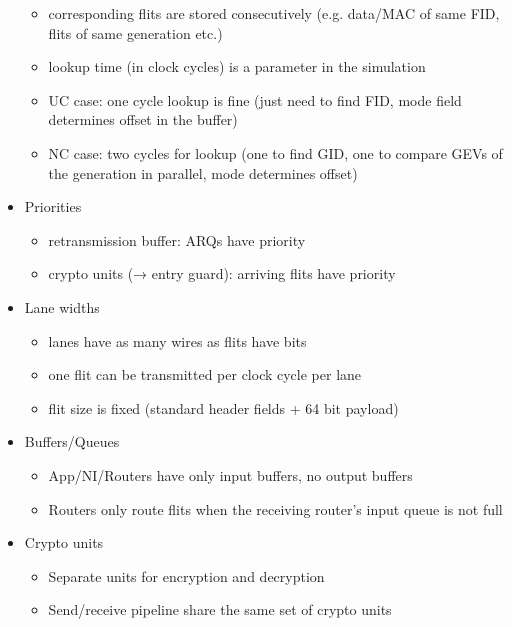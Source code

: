 \documentclass[
	paper=a4,
	fontsize=11pt,
	parskip=full %
]{scrreprt}
\begin{document}
\begin{itemize}
            \begin{itemize}
                \item corresponding flits are stored consecutively (e.g. data/MAC of same FID, flits of same generation etc.)
                \item lookup time (in clock cycles) is a parameter in the simulation
                \item UC case: one cycle lookup is fine (just need to find FID, mode field determines offset in the buffer)
                \item NC case: two cycles for lookup (one to find GID, one to compare GEVs of the generation in parallel, mode determines offset)
            \end{itemize}
        \item Priorities
            \begin{itemize}
                \item retransmission buffer: ARQs have priority
                \item crypto units (→ entry guard): arriving flits have priority
            \end{itemize}
        \item Lane widths
            \begin{itemize}
                \item lanes have as many wires as flits have bits
                \item one flit can be transmitted per clock cycle per lane
                \item flit size is fixed (standard header fields + 64 bit payload)
            \end{itemize}
        \item Buffers/Queues
            \begin{itemize}
                \item App/NI/Routers have only input buffers, no output buffers
                \item Routers only route flits when the receiving router's input queue is not full
            \end{itemize}
        \item Crypto units
            \begin{itemize}
                \item Separate units for encryption and decryption
                \item Send/receive pipeline share the same set of crypto units
            \end{itemize}

\end{itemize}
\end{document}
